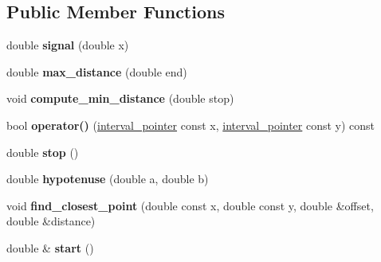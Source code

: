 \subsection*{Public Member Functions}
\begin{DoxyCompactItemize}
\item 
\hypertarget{classgeodesic_1_1_interval_a0882c603312c721d90882f25b4437b74}{}double {\bfseries signal} (double x)\label{classgeodesic_1_1_interval_a0882c603312c721d90882f25b4437b74}

\item 
\hypertarget{classgeodesic_1_1_interval_af259c70e3d8b4314f2b4b305ee0e6c7a}{}double {\bfseries max\+\_\+distance} (double end)\label{classgeodesic_1_1_interval_af259c70e3d8b4314f2b4b305ee0e6c7a}

\item 
\hypertarget{classgeodesic_1_1_interval_a3ead007bf10c60d7176384fb79108429}{}void {\bfseries compute\+\_\+min\+\_\+distance} (double stop)\label{classgeodesic_1_1_interval_a3ead007bf10c60d7176384fb79108429}

\item 
\hypertarget{classgeodesic_1_1_interval_a3674b70c9eb396e36b99ed743ad12276}{}bool {\bfseries operator()} (\hyperlink{classgeodesic_1_1_interval}{interval\+\_\+pointer} const x, \hyperlink{classgeodesic_1_1_interval}{interval\+\_\+pointer} const y) const \label{classgeodesic_1_1_interval_a3674b70c9eb396e36b99ed743ad12276}

\item 
\hypertarget{classgeodesic_1_1_interval_a617f1dbc519f7c56a9cb675f03fada92}{}double {\bfseries stop} ()\label{classgeodesic_1_1_interval_a617f1dbc519f7c56a9cb675f03fada92}

\item 
\hypertarget{classgeodesic_1_1_interval_a3fb3b9735b38db3fe64bc374afe5764a}{}double {\bfseries hypotenuse} (double a, double b)\label{classgeodesic_1_1_interval_a3fb3b9735b38db3fe64bc374afe5764a}

\item 
\hypertarget{classgeodesic_1_1_interval_acc19fb5bddb8f5ef4a0b3ae1c1868518}{}void {\bfseries find\+\_\+closest\+\_\+point} (double const x, double const y, double \&offset, double \&distance)\label{classgeodesic_1_1_interval_acc19fb5bddb8f5ef4a0b3ae1c1868518}

\item 
\hypertarget{classgeodesic_1_1_interval_a8e6b7a358505e45097482637dfcb91df}{}double \& {\bfseries start} ()\label{classgeodesic_1_1_interval_a8e6b7a358505e45097482637dfcb91df}


\end{DoxyCompactItemize}
